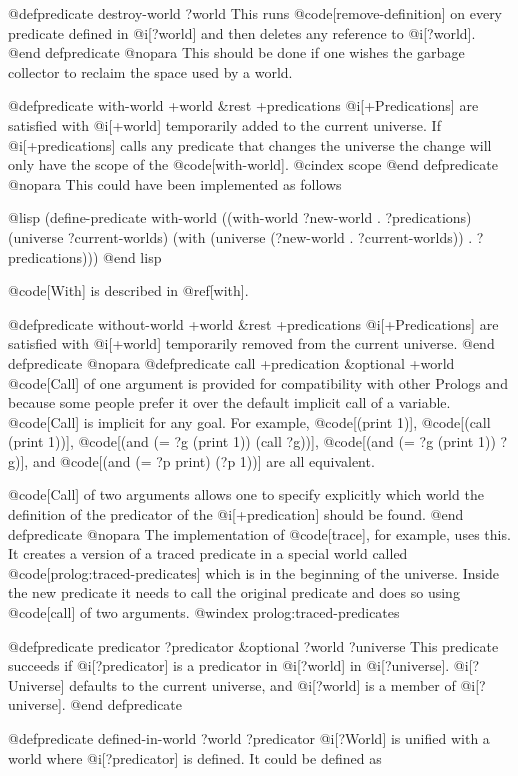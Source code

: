 {@defpredicate destroy-world ?world
This runs @code[remove-definition] on every predicate defined in @i[?world]
and then deletes any reference to @i[?world].
@end defpredicate
@nopara
This should be done if one wishes the garbage collector
to reclaim the space used by a world.

@defpredicate with-world +world &rest +predications
@i[+Predications] are satisfied with @i[+world] temporarily added
to the current universe.
If @i[+predications] calls any predicate that changes the universe the
change will only have the scope of the @code[with-world].
@cindex scope
@end defpredicate
@nopara
This could have been implemented as follows

@lisp
(define-predicate with-world
  ((with-world ?new-world . ?predications)
   (universe ?current-worlds)
   (with (universe (?new-world . ?current-worlds)) 
         . ?predications)))
@end lisp

@code[With] is described in @ref[with].

@defpredicate without-world +world &rest +predications
@i[+Predications] are satisfied with @i[+world] temporarily removed
from the current universe.
@end defpredicate
@nopara
@defpredicate call +predication &optional +world
@code[Call] of one argument is provided for compatibility with other Prologs
and because some people prefer it over the default implicit call of a variable.
@code[Call] is implicit for any goal.
For example, @code[(print 1)], @code[(call (print 1))],
@code[(and (= ?g (print 1)) (call ?g))], @code[(and (= ?g (print 1)) ?g)],
and @code[(and (= ?p print) (?p 1))] are all equivalent.

@code[Call] of two arguments allows one to specify explicitly which world the
definition of the predicator of the @i[+predication] should be found.
@end defpredicate
@nopara
The implementation of @code[trace], for example, uses this.
It creates a version of a traced predicate in a special world called
@code[prolog:traced-predicates] which is in the beginning of the universe.
Inside the new predicate it needs to call the original predicate and does so
using @code[call] of two arguments.
@windex prolog:traced-predicates

@defpredicate predicator ?predicator &optional ?world ?universe
This predicate succeeds if @i[?predicator] is a predicator in @i[?world]
in @i[?universe]. @i[?Universe] defaults to the current universe, and
@i[?world] is a member of @i[?universe].
@end defpredicate

@defpredicate defined-in-world ?world ?predicator
@i[?World] is unified with a world where @i[?predicator] is
defined.
It could be defined as

}
